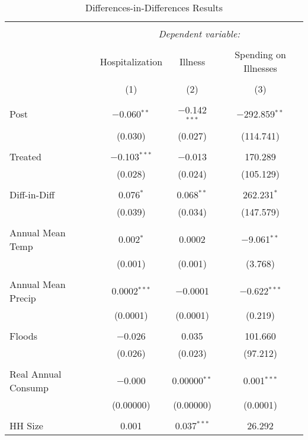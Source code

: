 
\begin{table}[!htbp] \centering 
  \caption{Differences-in-Differences Results} 
  \label{} 
\begin{tabular}{@{\extracolsep{5pt}}lccc} 
\\[-1.8ex]\hline 
\hline \\[-1.8ex] 
 & \multicolumn{3}{c}{\textit{Dependent variable:}} \\ 
\cline{2-4} 
\\[-1.8ex] & Hospitalization & Illness & Spending on Illnesses \\ 
\\[-1.8ex] & (1) & (2) & (3)\\ 
\hline \\[-1.8ex] 
 Post & $-$0.060$^{**}$ & $-$0.142$^{***}$ & $-$292.859$^{**}$ \\ 
  & (0.030) & (0.027) & (114.741) \\ 
  & & & \\ 
 Treated & $-$0.103$^{***}$ & $-$0.013 & 170.289 \\ 
  & (0.028) & (0.024) & (105.129) \\ 
  & & & \\ 
 Diff-in-Diff & 0.076$^{*}$ & 0.068$^{**}$ & 262.231$^{*}$ \\ 
  & (0.039) & (0.034) & (147.579) \\ 
  & & & \\ 
 Annual Mean Temp & 0.002$^{*}$ & 0.0002 & $-$9.061$^{**}$ \\ 
  & (0.001) & (0.001) & (3.768) \\ 
  & & & \\ 
 Annual Mean Precip & 0.0002$^{***}$ & $-$0.0001 & $-$0.622$^{***}$ \\ 
  & (0.0001) & (0.0001) & (0.219) \\ 
  & & & \\ 
 Floods & $-$0.026 & 0.035 & 101.660 \\ 
  & (0.026) & (0.023) & (97.212) \\ 
  & & & \\ 
 Real Annual Consump & $-$0.000 & 0.00000$^{**}$ & 0.001$^{***}$ \\ 
  & (0.00000) & (0.00000) & (0.0001) \\ 
  & & & \\ 
 HH Size & 0.001 & 0.037$^{***}$ & 26.292 \\ 

\end{tabular}
\end{table}
